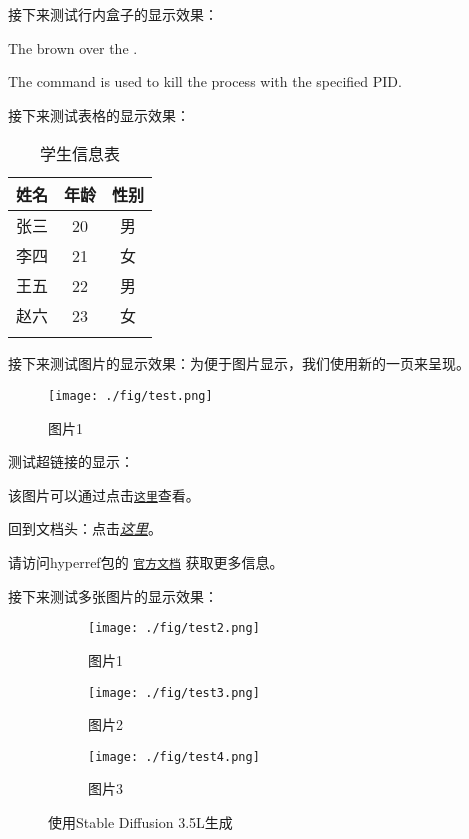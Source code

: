 \documentclass{article}
\begin{document}
接下来测试行内盒子的显示效果：

The  brown   over the  .

The  command is used to kill the process with the specified PID.

接下来测试表格的显示效果：

\Large
\begin{longtable}{|c|c|c|}
    \hline
    \rowcolor{blue!20}
    \textbf{姓名} & \textbf{年龄} & \textbf{性别} \\
    \hline
    张三 & \cellcolor{cyan!20} 20 & 男 \\
    \hline
    李四 & 21 & 女 \\
    \hline
    王五 & 22 & 男 \\
    \hline
    赵六 & 23 & 女 \\
    \hline
    \caption{学生信息表}
\end{longtable}
\normalsize

\newpage

接下来测试图片的显示效果：为便于图片显示，我们使用新的一页来呈现。

\begin{figure}[h]
    \centering
    \texttt{[image: ./fig/test.png]}
    \caption{图片1}
    \label{fig:testfig1}
\end{figure}

测试超链接的显示：

该图片可以通过点击\hyperref[fig:testfig1]{\texttt{这里}}查看。

回到文档头：点击\hyperref[sec:testbegin]{\textit{这里}}。

请访问hyperref包的 \href{https://www.ctan.org/pkg/hyperref}{\texttt{官方文档}} 获取更多信息。

\newpage
接下来测试多张图片的显示效果：

\begin{figure}[h]
    \centering
    \begin{subfigure}{0.3\textwidth}
        \centering
        \texttt{[image: ./fig/test2.png]}
        \caption{图片1}
        \label{fig:testfig2}
    \end{subfigure}
    \begin{subfigure}{0.3\textwidth}
        \centering
        \texttt{[image: ./fig/test3.png]}
        \caption{图片2}
        \label{fig:testfig3}
    \end{subfigure}
    \begin{subfigure}{0.3\textwidth}
        \centering
        \texttt{[image: ./fig/test4.png]}
        \caption{图片3}
        \label{fig:testfig4}
    \end{subfigure}
    \caption{使用Stable Diffusion 3.5L生成}
\end{figure}
\end{document}
